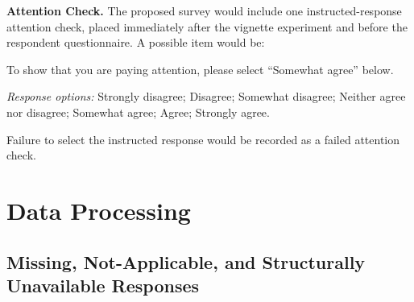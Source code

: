 \noindent\textbf{Attention Check.} The proposed survey would include one instructed-response attention check,
placed immediately after the vignette experiment and before the respondent
questionnaire. A possible item would be:

\medskip
\noindent
To show that you are paying attention, please select ``Somewhat agree'' below.

\smallskip
\noindent
\textit{Response options:} Strongly disagree; Disagree; Somewhat disagree;
Neither agree nor disagree; Somewhat agree; Agree; Strongly agree.

\medskip
\noindent
Failure to select the instructed response would be recorded as a failed
attention check.

\section{Data Processing}

\subsection{Missing, Not-Applicable, and Structurally Unavailable Responses}

